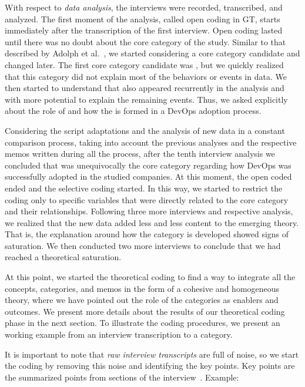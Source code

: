With respect to \emph{data analysis}, the interviews were
recorded, transcribed, and analyzed. The first moment
of the analysis, called open coding in GT, starts immediately after the
transcription of the first interview.
Open coding lasted until there was no
doubt about the core category of the study. Similar to that described by
Adolph et al.~\cite{adolph2012reconciling}, we started
considering a core category candidate and changed later. The first core category
candidate was , but we quickly realized that this category did not
explain most of the behaviors
or events in data. We then started to understand that
\cc also appeared recurrently in the analysis and with more
potential to explain the remaining events. Thus, we asked explicitly
about the role of  and how the \cc is formed
in a DevOps adoption process.

Considering the script adaptations and the analysis of new data in a constant
comparison process, taking into account the previous analyses and the
respective memos written during all the process, after the tenth
interview analysis we concluded that \cc was unequivocally the core
category regarding how DevOps was successfully adopted in the studied companies.
At this moment, the open coded ended and the selective coding started.
In this way, we started to restrict the coding only
to specific variables that were directly related to the core category and their
relationships. Following three more interviews and respective analysis, we realized that
the new data added less and less content to the emerging theory. That is, the
explanation around how the \cc category is developed showed signs of saturation.
We then conducted two more interviews to conclude that we had reached a
theoretical saturation.

At this point, we started the theoretical coding to find a way to integrate
all the concepts, categories, and memos in the form of a cohesive and
homogeneous theory, where we have pointed out the role of the categories as
enablers and outcomes. We present more details about
the results of our theoretical coding phase in the next section.
To illustrate the coding procedures, we present an working example from an
interview transcription to a category.

It is important to note that \emph{raw interview transcripts} are full of noise,
so we start the coding by removing this noise and identifying the key points.
Key points are the summarized points from sections of the interview~\cite{georgieva2008best}. Example:

